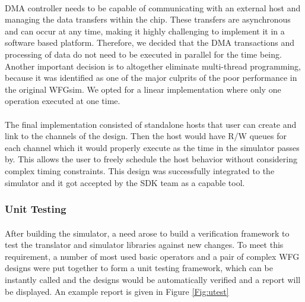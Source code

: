 \paragraph{}
DMA controller needs to be capable of communicating with an external host and managing the data transfers within the chip. These transfers are asynchronous and can occur at any time, making it highly challenging to implement it in a software based platform. Therefore, we decided that the DMA transactions and processing of data do not need to be executed in parallel for the time being. Another important decision is to altogether eliminate multi-thread programming, because it was identified as one of the major culprits of the poor performance in the original WFGsim. We opted for a linear implementation where only one operation executed at one time.

\paragraph{}
The final implementation consisted of standalone hosts that user can create and link to the channels of the design. Then the host would have R/W queues for each channel which it would properly execute as the time in the simulator passes by. This allows the user to freely schedule the host behavior without considering complex timing constraints. This design was successfully integrated to the simulator and it got accepted by the SDK team as a capable tool.

\subsubsection{Unit Testing}
\label{sec:unittest}
\paragraph{}
After building the simulator, a need arose to build a verification framework to test the translator and simulator libraries against new changes. To meet this requirement, a number of most used basic operators and a pair of complex WFG designs were put together to form a unit testing framework, which can be instantly called and the designs would be automatically verified and a report will be displayed. An example report is given in Figure \ref{Fig:utest}

